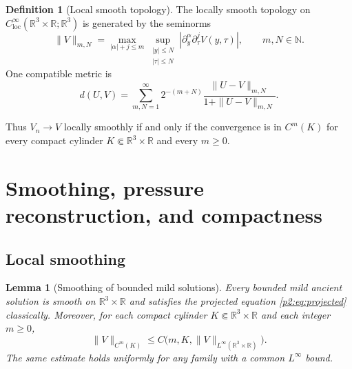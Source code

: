 \documentclass[11pt]{amsart}
\theoremstyle{plain}
\newtheorem{lemma}[lemma]{Lemma}
\theoremstyle{definition}
\newtheorem{definition}[definition]{Definition}
\theoremstyle{remark}
\numberwithin{equation}{section}
\newcommand{\R}{\mathbb R}
\newcommand{\N}{\mathbb N}
\newcommand{\loc}{\mathrm{loc}}
\begin{document}
\begin{definition}[Local smooth topology]\label{p2:def:local-smooth-topology}
The locally smooth topology on \(C^\infty_{\loc}(\R^3\times\R;\R^3)\) is
generated by the seminorms
\[
   \|V\|_{m,N}
   =
   \max_{|\alpha|+j\le m}
   \sup_{\substack{|y|\le N\\ |\tau|\le N}}
   |\partial_y^\alpha\partial_\tau^jV(y,\tau)|,
   \qquad m,N\in\N .
\]
One compatible metric is
\[
   d(U,V)
   =
   \sum_{m,N=1}^{\infty}
   2^{-(m+N)}
   \frac{\|U-V\|_{m,N}}{1+\|U-V\|_{m,N}}.
\]
\end{definition}

Thus \(V_n\to V\) locally smoothly if and only if the convergence is in
\(C^m(K)\) for every compact cylinder
\(K\Subset\R^3\times\R\) and every \(m\ge0\).

\section{Smoothing, pressure reconstruction, and compactness}
\label{p2:sec:smoothing-compactness}

\subsection{Local smoothing}

\begin{lemma}[Smoothing of bounded mild solutions]\label{p2:lem:mild-smoothing}
Every bounded mild ancient solution is smooth on \(\R^3\times\R\) and satisfies
the projected equation \eqref{p2:eq:projected} classically.  Moreover, for each
compact cylinder \(K\Subset\R^3\times\R\) and each integer \(m\ge0\),
\[
   \|V\|_{C^m(K)}
   \le
   C\bigl(m,K,\|V\|_{L^\infty(\R^3\times\R)}\bigr).
\]
The same estimate holds uniformly for any family with a common
\(L^\infty\) bound.
\end{lemma}
\end{document}

